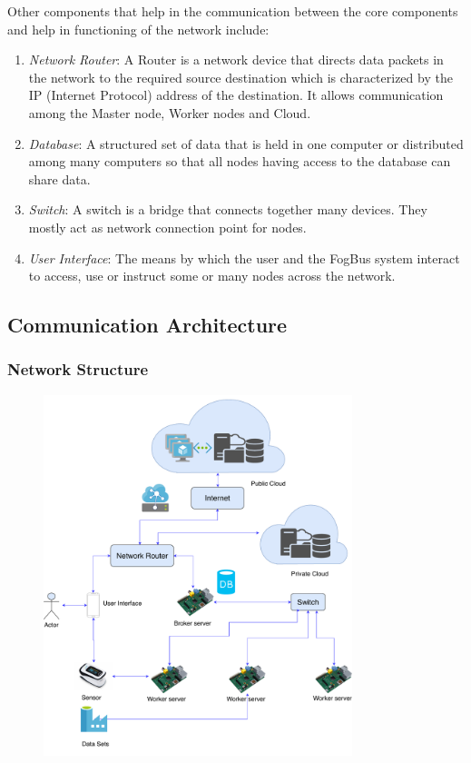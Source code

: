 \documentclass[10pt,journal,compsoc]{IEEEtran}
\begin{document}
Other components that help in the communication between the core components and help in functioning of the network include:
\begin{enumerate}
\item \textit{Network Router}: A Router is a network device that directs data packets in the network to the required source destination which is characterized by the IP (Internet Protocol) address of the destination. It allows communication among the Master node, Worker nodes and Cloud.
\item \textit{Database}: A structured set of data that is held in one computer or distributed among many computers so that all nodes having access to the database can share data.
\item \textit{Switch}: A switch is a bridge that connects together many devices. They mostly act as network connection point for nodes.
\item \textit{User Interface}: The means by which the user and the FogBus system interact to access, use or instruct some or many nodes across the network. 
\end{enumerate}

\subsection{Communication Architecture}

\subsubsection{Network Structure}
\begin{figure}[h]
\centering
\includegraphics[width=9cm]{network-arch}
\end{figure}
\end{document}
